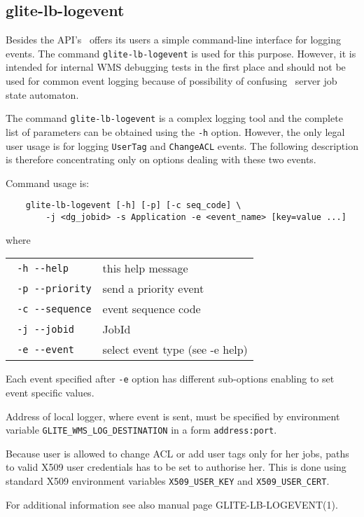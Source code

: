 \subsection{glite-lb-logevent}
\label{glite-lb-logevent}

Besides the API's \LB\ offers its users a simple command-line interface for
logging events. The command \verb'glite-lb-logevent' is used for this purpose.
However, it is intended for internal WMS debugging tests in the first place and
should not be used for common event logging because of possibility of confusing
\LB\ server job state automaton.

The command \verb'glite-lb-logevent' is a complex logging tool and the complete
list of parameters can be obtained using the \verb'-h' option.  However,
the only legal user usage is for logging \verb'UserTag' and \verb'ChangeACL'
events. The following description is therefore concentrating only on options
dealing with these two events.

Command usage is:

\begin{verbatim}
    glite-lb-logevent [-h] [-p] [-c seq_code] \
        -j <dg_jobid> -s Application -e <event_name> [key=value ...]
\end{verbatim}

where

\begin{tabularx}{\textwidth}{lX}
\texttt{  -h  -{}-help} &           this help message\\
\texttt{  -p  -{}-priority} &       send a priority event\\
\texttt{  -c  -{}-sequence} &       event sequence code\\
\texttt{  -j  -{}-jobid} &          JobId\\
\texttt{  -e  -{}-event} &           select event type (see -e help)\\
\end{tabularx}


Each event specified after \verb'-e' option has different sub-options enabling
to set event specific values.

Address of local logger, where event is sent, must be specified by environment
variable \verb'GLITE_WMS_LOG_DESTINATION' in a form \verb'address:port'.

Because user is allowed to change ACL or add user tags only for her jobs, paths
to valid X509 user credentials has to be set to authorise her. This is done
using standard X509 environment variables \verb'X509_USER_KEY' and
\verb'X509_USER_CERT'.

For additional information see also manual page GLITE-LB-LOGEVENT(1).




